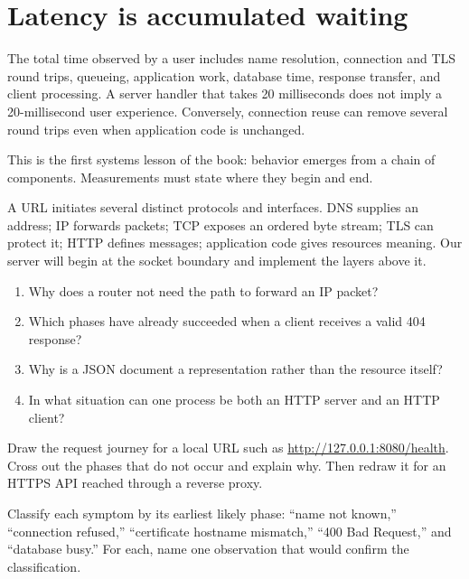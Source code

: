 \section{Latency is accumulated waiting}

The total time observed by a user includes name resolution, connection and TLS
round trips, queueing, application work, database time, response transfer, and
client processing. A server handler that takes 20 milliseconds does not imply a
20-millisecond user experience. Conversely, connection reuse can remove several
round trips even when application code is unchanged.

This is the first systems lesson of the book: behavior emerges from a chain of
components. Measurements must state where they begin and end.

\summarytitle

A URL initiates several distinct protocols and interfaces. DNS supplies an
address; IP forwards packets; TCP exposes an ordered byte stream; TLS can protect
it; HTTP defines messages; application code gives resources meaning. Our server
will begin at the socket boundary and implement the layers above it.

\reviewtitle
\begin{enumerate}
  \item Why does a router not need the path  to forward an IP packet?
  \item Which phases have already succeeded when a client receives a valid 404 response?
  \item Why is a JSON document a representation rather than the resource itself?
  \item In what situation can one process be both an HTTP server and an HTTP client?
\end{enumerate}

\begin{exercise}
Draw the request journey for a local URL such as
\url{http://127.0.0.1:8080/health}. Cross out the phases that do not occur and
explain why. Then redraw it for an HTTPS API reached through a reverse proxy.
\end{exercise}

\begin{exercise}
Classify each symptom by its earliest likely phase: ``name not known,''
``connection refused,'' ``certificate hostname mismatch,'' ``400 Bad Request,''
and ``database busy.'' For each, name one observation that would confirm the
classification.
\end{exercise}

